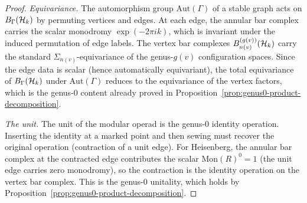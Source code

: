 \begin{proof}
\medskip\noindent
\emph{Equivariance.}
The automorphism group $\mathrm{Aut}(\Gamma)$ of a
stable graph acts on $B_\Gamma(\mathcal{H}_k)$ by permuting
vertices and edges. At each edge, the annular bar
complex carries the scalar monodromy
$\exp(-2\pi ik)$, which is invariant under the induced
permutation of edge labels. The vertex bar complexes
$B^{(g(v))}_{n(v)}(\mathcal{H}_k)$ carry the standard
$\Sigma_{n(v)}$-equivariance of the genus-$g(v)$
configuration spaces. Since the edge data is
scalar (hence automatically equivariant), the total
equivariance of $B_\Gamma(\mathcal{H}_k)$ under
$\mathrm{Aut}(\Gamma)$ reduces to the equivariance
of the vertex factors, which is the genus-$0$ content
already proved in
Proposition~\ref{prop:genus0-product-decomposition}.

\medskip\noindent
\emph{The unit.}
The unit of the modular operad is the genus-$0$
identity operation. Inserting the identity at a
marked point and then sewing must recover the
original operation (contraction of a unit edge).
For Heisenberg, the annular bar complex at the
contracted edge contributes the scalar
$\mathrm{Mon}(R)^0 = 1$ (the unit edge carries zero
monodromy), so the contraction is the identity
operation on the vertex bar complex. This is the
genus-$0$ unitality, which holds by
Proposition~\ref{prop:genus0-product-decomposition}.
\end{proof}

